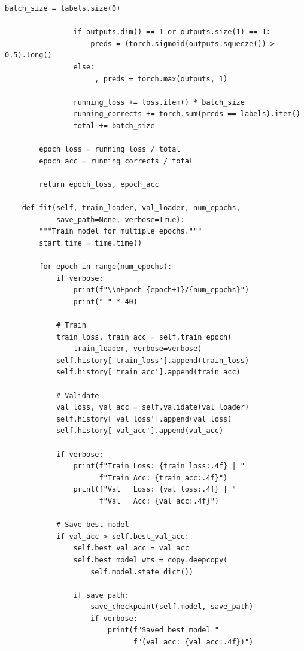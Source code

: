 \documentclass[man,12pt,letterpaper,donotrepeattitle,floatsintext]{apa7}
\begin{document}
\begin{lstlisting}[style=pythonstyle]
                batch_size = labels.size(0)
                
                if outputs.dim() == 1 or outputs.size(1) == 1:
                    preds = (torch.sigmoid(outputs.squeeze()) > 0.5).long()
                else:
                    _, preds = torch.max(outputs, 1)
                
                running_loss += loss.item() * batch_size
                running_corrects += torch.sum(preds == labels).item()
                total += batch_size
        
        epoch_loss = running_loss / total
        epoch_acc = running_corrects / total
        
        return epoch_loss, epoch_acc
    
    def fit(self, train_loader, val_loader, num_epochs, 
            save_path=None, verbose=True):
        """Train model for multiple epochs."""
        start_time = time.time()
        
        for epoch in range(num_epochs):
            if verbose:
                print(f"\\nEpoch {epoch+1}/{num_epochs}")
                print("-" * 40)
            
            # Train
            train_loss, train_acc = self.train_epoch(
                train_loader, verbose=verbose)
            self.history['train_loss'].append(train_loss)
            self.history['train_acc'].append(train_acc)
            
            # Validate
            val_loss, val_acc = self.validate(val_loader)
            self.history['val_loss'].append(val_loss)
            self.history['val_acc'].append(val_acc)
            
            if verbose:
                print(f"Train Loss: {train_loss:.4f} | "
                      f"Train Acc: {train_acc:.4f}")
                print(f"Val   Loss: {val_loss:.4f} | "
                      f"Val   Acc: {val_acc:.4f}")
            
            # Save best model
            if val_acc > self.best_val_acc:
                self.best_val_acc = val_acc
                self.best_model_wts = copy.deepcopy(
                    self.model.state_dict())
                
                if save_path:
                    save_checkpoint(self.model, save_path)
                    if verbose:
                        print(f"Saved best model "
                              f"(val_acc: {val_acc:.4f})")
        

\end{lstlisting}
\end{document}
